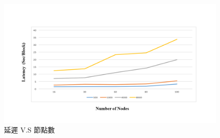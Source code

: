 \begin{figure}[htp]
\centering
\includegraphics[scale=0.5]{images/64.png}
\caption{延遲 V.S 節點數}
\label{i:byz-latency}
\end{figure}
